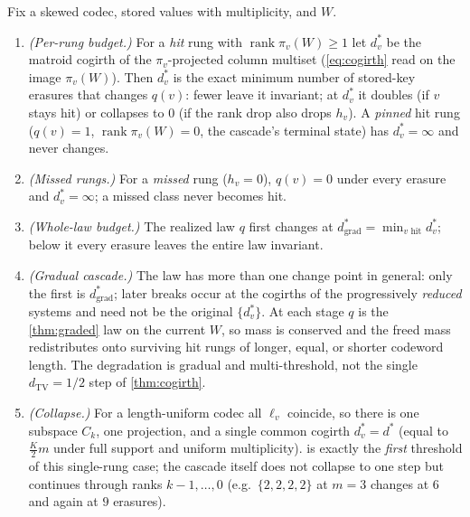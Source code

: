 \documentclass[acmsmall,review]{acmart}
\newcommand{\TV}{d_{\mathrm{TV}}}
\DeclareMathOperator{\rank}{rank}
\newcommand{\W}{W}                          %
\newcommand{\proj}{\pi}                     %
\begin{document}
\begin{theorem}
\label{thm:cogirth-graded}
Fix a skewed codec, stored values with multiplicity, and $\W$.
\begin{enumerate}
  \item \emph{(Per-rung budget.)} For a \emph{hit} rung with $\rank \proj_v(\W) \ge 1$ let
  $d^\ast_v$ be the matroid cogirth of the $\proj_v$-projected column multiset
  (\eqref{eq:cogirth} read on the image $\proj_v(\W)$). Then $d^\ast_v$ is the exact minimum
  number of stored-key erasures that changes $q(v)$: fewer leave it invariant; at $d^\ast_v$ it
  doubles (if $v$ stays hit) or collapses to $0$ (if the rank drop also drops $h_v$). A
  \emph{pinned} hit rung ($q(v) = 1$, $\rank \proj_v(\W) = 0$, the cascade's terminal state)
  has $d^\ast_v = \infty$ and never changes.
  \item \emph{(Missed rungs.)} For a \emph{missed} rung ($h_v = 0$), $q(v) = 0$ under every
  erasure and $d^\ast_v = \infty$; a missed class never becomes hit.
  \item \emph{(Whole-law budget.)} The realized law $q$ first changes at
  $d^\ast_{\mathrm{grad}} = \min_{v \text{ hit}} d^\ast_v$; below it every erasure leaves the
  entire law invariant.
  \item \emph{(Gradual cascade.)} The law has more than one change point in general: only
  the first is $d^\ast_{\mathrm{grad}}$; later breaks occur at the cogirths of the
  progressively \emph{reduced} systems and need not be the original $\{d^\ast_v\}$. At each
  stage $q$ is the \cref{thm:graded} law on the current $\W$, so mass is conserved and the
  freed mass redistributes onto surviving hit rungs of longer, equal, or shorter codeword
  length. The degradation is gradual and multi-threshold, not the single $\TV = 1/2$ step of
  \cref{thm:cogirth}.
  \item \emph{(Collapse.)} For a length-uniform codec all $\ell_v$ coincide, so there is one
  subspace $C_k$, one projection, and a single common cogirth $d^\ast_v = d^\ast$ (equal to
  $\tfrac{K}{2}m$ under full support and uniform multiplicity).  is exactly
  the \emph{first} threshold of this single-rung case; the cascade itself does not collapse to
  one step but continues through ranks $k{-}1,\dots,0$ (e.g.\ $\{2,2,2,2\}$ at $m=3$ changes at
  $6$ and again at $9$ erasures).
\end{enumerate}
\end{theorem}
\end{document}
